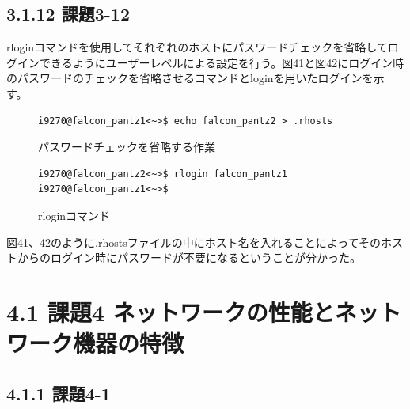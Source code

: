 \documentclass[12pt]{jreport}
\begin{document}
            \subsection*{3.1.12 課題3-12}
                rloginコマンドを使用してそれぞれのホストにパスワードチェックを省略してログインできるようにユーザーレベルによる設定を行う。図41と図42にログイン時のパスワードのチェックを省略させるコマンドとloginを用いたログインを示す。
                \begin{figure}[H]
                    \begin{center}
                        \begin{screen}
                            \begin{verbatim}
i9270@falcon_pantz1<~>$ echo falcon_pantz2 > .rhosts
                            \end{verbatim}
                        \end{screen}
                        \caption{パスワードチェックを省略する作業}
                        \label{41}
                    \end{center}
                \end{figure}
                \begin{figure}[H]
                    \begin{center}
                        \begin{screen}
                            \begin{verbatim}
i9270@falcon_pantz2<~>$ rlogin falcon_pantz1
i9270@falcon_pantz1<~>$ 
                            \end{verbatim}
                        \end{screen}
                        \caption{rloginコマンド}
                        \label{42}
                    \end{center}
                \end{figure}
                図41、42のように.rhostsファイルの中にホスト名を入れることによってそのホストからのログイン時にパスワードが不要になるということが分かった。

        \section*{4.1 課題4 ネットワークの性能とネットワーク機器の特徴}
            \subsection*{4.1.1  課題4-1}
\end{document}
